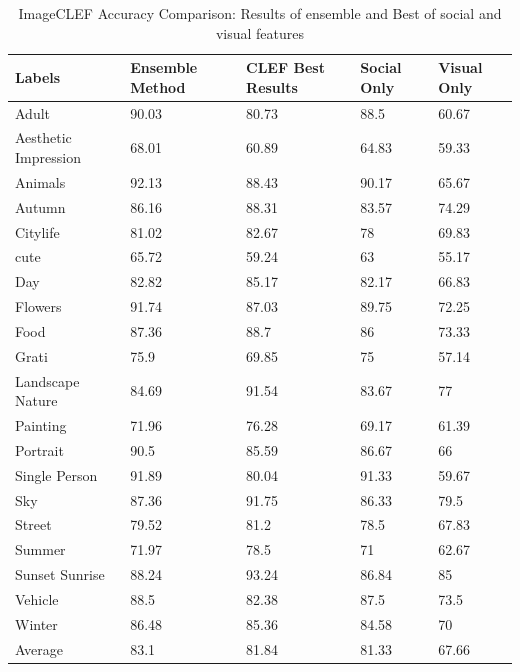 \begin{table}
\centering
\caption{ ImageCLEF Accuracy Comparison:  Results of ensemble and Best of social and visual features} %
\vspace*{0.2 cm}
\begin{tabular}{| p{1.7cm}| p{1.5cm}|p{1.2cm}|p{1.2cm}|p{1.2cm}|} \hline
Labels & Ensemble Method & CLEF Best Results & Social Only & Visual Only  \\  [1ex] \hline
Adult & 90.03 & 80.73 & 88.5 & 60.67 \\ [1ex] \hline
Aesthetic Impression & 68.01 & 60.89 & 64.83 & 59.33 \\ [1ex] \hline
Animals & 92.13 & 88.43 & 90.17 & 65.67 \\ [1ex] \hline
Autumn & 86.16 & 88.31 & 83.57 & 74.29 \\ [1ex] \hline
Citylife & 81.02 & 82.67 & 78 & 69.83 \\ [1ex] \hline
cute & 65.72 & 59.24 & 63 & 55.17 \\ [1ex] \hline
Day & 82.82 & 85.17 & 82.17 & 66.83 \\ [1ex] \hline
Flowers & 91.74 & 87.03 & 89.75 & 72.25 \\ [1ex] \hline
Food & 87.36 & 88.7 & 86 & 73.33 \\ [1ex] \hline
Grati & 75.9 & 69.85 & 75 & 57.14 \\ [1ex] \hline
Landscape Nature & 84.69 & 91.54 & 83.67 & 77 \\ [1ex] \hline
Painting & 71.96 & 76.28 & 69.17 & 61.39 \\ [1ex] \hline
Portrait & 90.5 & 85.59 & 86.67 & 66 \\ [1ex] \hline
Single Person & 91.89 & 80.04 & 91.33 & 59.67 \\ [1ex] \hline
Sky & 87.36 & 91.75 & 86.33 & 79.5 \\ [1ex] \hline
Street & 79.52 & 81.2 & 78.5 & 67.83 \\ [1ex] \hline
Summer & 71.97 & 78.5 & 71 & 62.67 \\ [1ex] \hline
Sunset Sunrise & 88.24 & 93.24 & 86.84 & 85 \\ [1ex] \hline
Vehicle & 88.5 & 82.38 & 87.5 & 73.5 \\ [1ex] \hline
Winter & 86.48 & 85.36 & 84.58 & 70 \\ [1ex] \hline
Average & 83.1 & 81.84 & 81.33 & 67.66 \\ [1ex] \hline
\end{tabular}
 \label{ImageCLEFAccuracyOverAll} %
\end{table}


